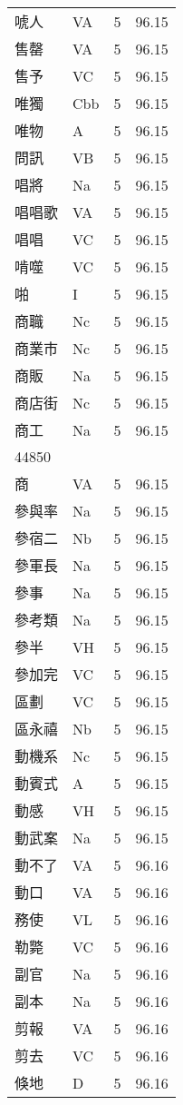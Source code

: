 \documentclass[twocolumn]{book}
\begin{document}
\begin{supertabular}{llrr}
唬人 & VA & 5 &  96.15\\
售罄 & VA & 5 &  96.15\\
售予 & VC & 5 &  96.15\\
唯獨 & Cbb & 5 &  96.15\\
唯物 & A & 5 &  96.15\\
問訊 & VB & 5 &  96.15\\
唱將 & Na & 5 &  96.15\\
唱唱歌 & VA & 5 &  96.15\\
唱唱 & VC & 5 &  96.15\\
啃噬 & VC & 5 &  96.15\\
啪 & I & 5 &  96.15\\
商職 & Nc & 5 &  96.15\\
商業市 & Nc & 5 &  96.15\\
商販 & Na & 5 &  96.15\\
商店街 & Nc & 5 &  96.15\\
商工 & Na & 5 &  96.15\\
44850\\
商 & VA & 5 &  96.15\\
參與率 & Na & 5 &  96.15\\
參宿二 & Nb & 5 &  96.15\\
參軍長 & Na & 5 &  96.15\\
參事 & Na & 5 &  96.15\\
參考類 & Na & 5 &  96.15\\
參半 & VH & 5 &  96.15\\
參加完 & VC & 5 &  96.15\\
區劃 & VC & 5 &  96.15\\
區永禧 & Nb & 5 &  96.15\\
動機系 & Nc & 5 &  96.15\\
動賓式 & A & 5 &  96.15\\
動感 & VH & 5 &  96.15\\
動武案 & Na & 5 &  96.15\\
動不了 & VA & 5 &  96.16\\
動口 & VA & 5 &  96.16\\
務使 & VL & 5 &  96.16\\
勒斃 & VC & 5 &  96.16\\
副官 & Na & 5 &  96.16\\
副本 & Na & 5 &  96.16\\
剪報 & VA & 5 &  96.16\\
剪去 & VC & 5 &  96.16\\
倏地 & D & 5 &  96.16\\

\end{supertabular}
\end{document}
